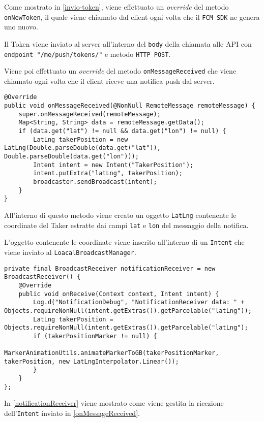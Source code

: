 Come mostrato in \autoref{invio-token}, viene effettuato un \emph{override} del metodo \texttt{onNewToken}, il quale viene chiamato dal client ogni volta che il \texttt{FCM SDK} ne genera uno nuovo.

Il Token viene inviato al server all'interno del \texttt{body} della chiamata alle API con \texttt{endpoint "/me/push/tokens/"} e metodo \texttt{HTTP POST}.

Viene poi effettuato un \emph{override} del metodo \texttt{onMessageReceived} che viene chiamato ogni volta che il client riceve una notifica push dal server.

\begin{lstlisting}[caption=Override del metodo per gestire la ricezione di notifiche push, label=onMessageReceived]
@Override
public void onMessageReceived(@NonNull RemoteMessage remoteMessage) {
    super.onMessageReceived(remoteMessage);
    Map<String, String> data = remoteMessage.getData();
    if (data.get("lat") != null && data.get("lon") != null) {
        LatLng takerPosition = new LatLng(Double.parseDouble(data.get("lat")), Double.parseDouble(data.get("lon")));
        Intent intent = new Intent("TakerPosition");
        intent.putExtra("latLng", takerPosition);
        broadcaster.sendBroadcast(intent);
    }
}
\end{lstlisting}

All'interno di questo metodo viene creato un oggetto \texttt{LatLng} contenente le coordinate del Taker estratte dai campi \texttt{lat} e \texttt{lon} del messaggio della notifica.

L'oggetto contenente le coordinate viene inserito all'interno di un \texttt{Intent} che viene inviato al \texttt{LoacalBroadcastManager}.

\begin{lstlisting}[caption=Gestione dell'intent, label=notificationReceiver]
private final BroadcastReceiver notificationReceiver = new BroadcastReceiver() {
    @Override
    public void onReceive(Context context, Intent intent) {
        Log.d("NotificationDebug", "NotificationReceiver data: " + Objects.requireNonNull(intent.getExtras()).getParcelable("latLng"));
        LatLng takerPosition = Objects.requireNonNull(intent.getExtras()).getParcelable("latLng");
        if (takerPositionMarker != null) {
            MarkerAnimationUtils.animateMarkerToGB(takerPositionMarker, takerPosition, new LatLngInterpolator.Linear());
        }
    }
};
\end{lstlisting}

In \autoref{notificationReceiver} viene mostrato come viene gestita la ricezione dell'\texttt{Intent} inviato in \autoref{onMessageReceived}.

